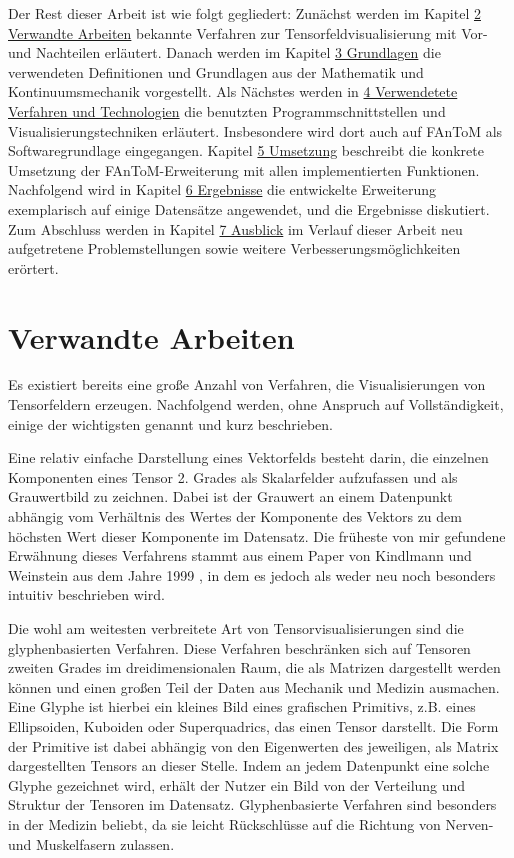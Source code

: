\documentclass[a4paper,fontsize=12pt,toc=bib,halfparskip]{scrartcl}
\begin{document}
Der Rest dieser Arbeit ist wie folgt gegliedert: Zun\"achst werden im Kapitel \hyperref[sec:Verwandte]{2 Verwandte Arbeiten} bekannte Verfahren zur Tensorfeldvisualisierung mit Vor- und Nachteilen erl\"autert. Danach werden im Kapitel \hyperref[sec:Grundlagen]{3 Grundlagen} die verwendeten Definitionen und Grundlagen aus der Mathematik und Kontinuumsmechanik vorgestellt. Als N\"achstes werden in \hyperref[sec:Technologien]{4 Verwendetete Verfahren und Technologien} die benutzten Programmschnittstellen und Visualisierungstechniken erl\"autert. Insbesondere wird dort auch auf FAnToM als Softwaregrundlage eingegangen. Kapitel \hyperref[sec:Umsetzung]{5 Umsetzung} beschreibt die konkrete Umsetzung der FAnToM-Erweiterung mit allen implementierten Funktionen. Nachfolgend wird in Kapitel \hyperref[sec:Ergebnisse]{6 Ergebnisse} die entwickelte Erweiterung exemplarisch auf einige Datens\"atze angewendet, und die Ergebnisse diskutiert. Zum Abschluss werden in Kapitel \hyperref[sec:Ausblick]{7 Ausblick} im Verlauf dieser Arbeit neu aufgetretene Problemstellungen sowie weitere Verbesserungsm\"oglichkeiten er\"ortert.
 
\section{Verwandte Arbeiten}
\label{sec:Verwandte}
Es existiert bereits eine gro{\ss}e Anzahl von Verfahren, die Visualisierungen von Tensorfeldern erzeugen. Nachfolgend werden, ohne Anspruch auf Vollst\"andigkeit, einige der wichtigsten genannt und kurz beschrieben.

Eine relativ einfache Darstellung eines Vektorfelds besteht darin, die einzelnen Komponenten eines Tensor 2. Grades als Skalarfelder aufzufassen und als Grauwertbild zu zeichnen. Dabei ist der Grauwert an einem Datenpunkt abh\"angig vom Verh\"altnis des Wertes der Komponente des Vektors zu dem h\"ochsten Wert dieser Komponente im Datensatz. Die fr\"uheste von mir gefundene Erw\"ahnung dieses Verfahrens stammt aus einem Paper von Kindlmann und Weinstein aus dem Jahre 1999 \cite{kindlmann1999hue}, in dem es jedoch als weder neu noch besonders intuitiv beschrieben wird. 

Die wohl am weitesten verbreitete Art von Tensorvisualisierungen sind die glyphenbasierten Verfahren. Diese Verfahren beschr\"anken sich auf Tensoren zweiten Grades im dreidimensionalen Raum, die als Matrizen dargestellt werden k\"onnen und einen gro{\ss}en Teil der Daten aus Mechanik und Medizin ausmachen. Eine Glyphe ist hierbei ein kleines Bild eines grafischen Primitivs, z.B. eines Ellipsoiden, Kuboiden oder Superquadrics\cite{kindlmann2004superquadric}, das einen Tensor darstellt. Die Form der Primitive ist dabei abh\"angig von den Eigenwerten des jeweiligen, als Matrix dargestellten Tensors an dieser Stelle. Indem an jedem Datenpunkt eine solche Glyphe gezeichnet wird, erh\"alt der Nutzer ein Bild von der Verteilung und Struktur der Tensoren im Datensatz. Glyphenbasierte Verfahren sind besonders in der Medizin beliebt, da sie leicht R\"uckschl\"usse auf die Richtung von Nerven- und Muskelfasern zulassen.
\end{document}
